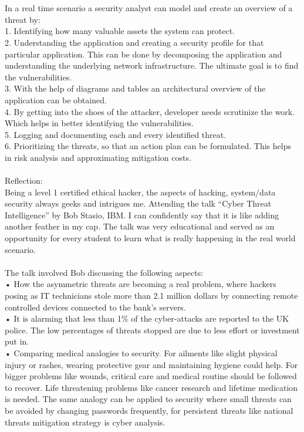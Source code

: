 \documentclass{article}
\begin{document}
\\
\\
In a real time scenario a security analyst can model and create an overview of a threat by:\\
1.	Identifying how many valuable assets the system can protect.\\
2.	Understanding the application and creating a security profile for that particular application. This can be done by decomposing 			the application and understanding the underlying network infrastructure. The ultimate goal is to find the vulnerabilities.\\
3.	With the help of diagrams and tables an architectural overview of the application can be obtained.\\
4.	By getting into the shoes of the attacker, developer needs scrutinize the work. Which helps in better identifying the 				vulnerabilities.\\
5.	Logging and documenting each and every identified threat.\\
6.	Prioritizing the threats, so that an action plan can be formulated. This helps in risk analysis and approximating mitigation costs.
\\
\\
Reflection:\\
Being a level 1 certified ethical hacker, the aspects of hacking, system/data security always geeks and intrigues me. Attending the talk “Cyber Threat Intelligence” by Bob Stasio, IBM. I can confidently say that it is like adding another feather in my cap.
The talk was very educational and served as an opportunity for every student to learn what is really happening in the real world scenario.
\\
\\
The talk involved Bob discussing the following aspects:\\
•	How the asymmetric threats are becoming a real problem, where hackers posing as IT technicians stole more than 2.1 million 			dollars by connecting remote controlled devices connected to the bank’s servers.\\
•	It is alarming that less than 1\% of the cyber-attacks are reported to the UK police. The low percentages of threats stopped 			are due to less effort or investment put in.\\
•	Comparing medical analogies to security. For ailments like slight physical injury or rashes, wearing protective gear and 				maintaining hygiene could help. For bigger problems like wounds, critical care and medical routine should be followed to 				recover. Life threatening problems like cancer research and lifetime medication is needed. The same analogy can be applied to 			security where small threats can be avoided by changing passwords frequently, for persistent threats like national threats 			mitigation strategy is cyber analysis.\\
\end{document}
